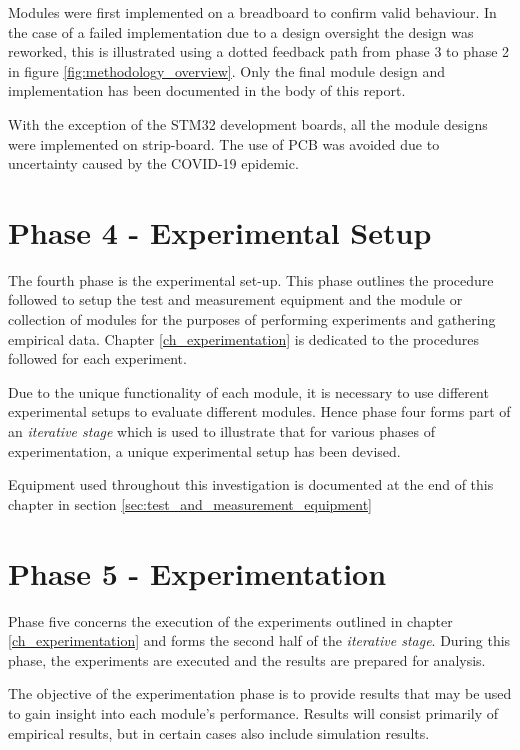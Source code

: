 Modules were first implemented on a breadboard to confirm valid behaviour. In the case of a failed implementation due to a design oversight the design was reworked, this is illustrated using a dotted feedback path from phase 3 to phase 2 in figure \ref{fig:methodology_overview}. Only the final module design and implementation has been documented in the body of this report.

With the exception of the STM32 development boards, all the module designs were implemented on strip-board. The use of PCB was avoided due to uncertainty caused by the COVID-19 epidemic.



\section{Phase 4 - Experimental Setup}

The fourth phase is the experimental set-up. This phase outlines the procedure followed to setup the test and measurement equipment and the module or collection of modules for the purposes of performing experiments and gathering empirical data. Chapter \ref{ch_experimentation} is dedicated to the procedures followed for each experiment.

Due to the unique functionality of each module, it is necessary to use different experimental setups to evaluate different modules. Hence phase four forms part of an \textit{iterative stage} which is used to illustrate that for various phases of experimentation, a unique experimental setup has been devised.

Equipment used throughout this investigation is documented at the end of this chapter in section \ref{sec:test_and_measurement_equipment}





\section{Phase 5 - Experimentation}

Phase five concerns the execution of the experiments outlined in chapter \ref{ch_experimentation} and forms the second half of the \textit{iterative stage}. During this phase, the experiments are executed and the results are prepared for analysis.

The objective of the experimentation phase is to provide results that may be used to gain insight into each module's performance. Results will consist primarily of empirical results, but in certain cases also include simulation results.

